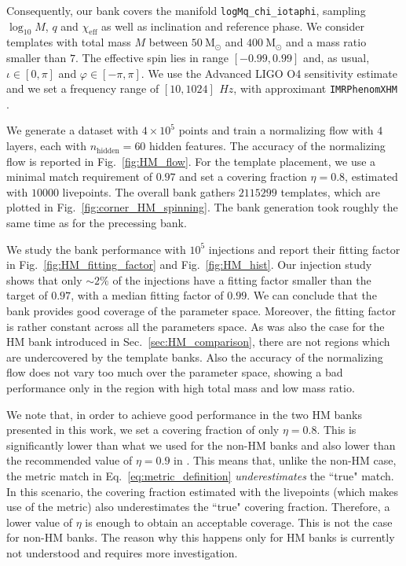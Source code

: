 \documentclass[twocolumn,showpacs,preprintnumbers,nofootinbib,prd,
superscriptaddress,10pt]{revtex4-2}
\begin{document}
Consequently, our bank covers the manifold \texttt{logMq\_chi\_iotaphi}, sampling $\log_{10}M$, $q$ and $\chi_\text{eff}$ as well as inclination and reference phase.
We consider templates with total mass $M$ between $\SI{50}{\mathrm{M_\odot}}$ and $\SI{400}{\mathrm{M_\odot}}$ and a mass ratio smaller than $7$. The effective spin lies in range $[-0.99, 0.99]$ and, as usual, $\iota \in [0, \pi]$ and $\varphi \in [-\pi, \pi]$.
We use the Advanced LIGO O4 sensitivity estimate \cite{O4_PSDs} and we set a frequency range of $[10, 1024]\,\SI{}{Hz}$, with approximant \texttt{IMRPhenomXHM} \cite{Garcia-Quiros:2020qpx}.

We generate a dataset with $4\times 10^5$ points and train a normalizing flow with $4$ layers, each with $n_\text{hidden} = 60$ hidden features. The accuracy of the normalizing flow is reported in Fig.~\ref{fig:HM_flow}.
For the template placement, we use a minimal match requirement of $0.97$ and set a covering fraction $\eta = 0.8$, estimated with $10000$ livepoints.
The overall bank gathers $2115299$ templates, which are plotted in Fig.~\ref{fig:corner_HM_spinning}.
The bank generation took roughly the same time as for the precessing bank.

We study the bank performance with $10^5$ injections and report their fitting factor in Fig.~\ref{fig:HM_fitting_factor} and Fig.~\ref{fig:HM_hist}.
Our injection study shows that only $\sim 2\%$ of the injections have a fitting factor smaller than the target of $0.97$, with a median fitting factor of $0.99$. We can conclude that the bank provides good coverage of the parameter space.
Moreover, the fitting factor is rather constant across all the parameters space. As was also the case for the HM bank introduced in Sec.~\ref{sec:HM_comparison}, there are not regions which are undercovered by the template banks.
Also the accuracy of the normalizing flow does not vary too much over the parameter space, showing a bad performance only in the region with high total mass and low mass ratio.

We note that, in order to achieve good performance in the two HM banks presented in this work, we set a covering fraction of only $\eta = 0.8$. This is significantly lower than what we used for the non-HM banks and also lower than the recommended value of $\eta = 0.9$ in \cite{Coogan:2022qxs}.
This means that, unlike the non-HM case, the metric match in Eq.~\ref{eq:metric_definition} {\it underestimates} the ``true" match. In this scenario, the covering fraction estimated with the livepoints (which makes use of the metric) also underestimates the ``true" covering fraction. Therefore, a lower value of $\eta$ is enough to obtain an acceptable coverage. This is not the case for non-HM banks.
The reason why this happens only for HM banks is currently not understood and requires more investigation.
\end{document}
